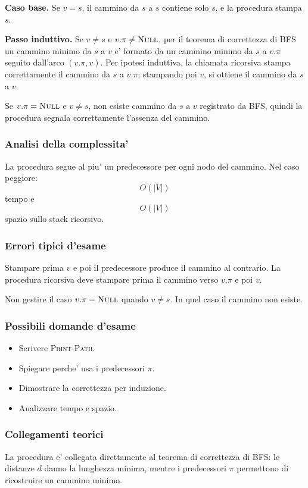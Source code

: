 \textbf{Caso base.}
Se $v=s$, il cammino da $s$ a $s$ contiene solo $s$, e la procedura stampa $s$.

\textbf{Passo induttivo.}
Se $v\neq s$ e $v.\pi\neq\textsc{Null}$, per il teorema di correttezza di BFS un cammino minimo da $s$ a $v$ e' formato da un cammino minimo da $s$ a $v.\pi$ seguito dall'arco $(v.\pi,v)$. Per ipotesi induttiva, la chiamata ricorsiva stampa correttamente il cammino da $s$ a $v.\pi$; stampando poi $v$, si ottiene il cammino da $s$ a $v$.

Se $v.\pi=\textsc{Null}$ e $v\neq s$, non esiste cammino da $s$ a $v$ registrato da BFS, quindi la procedura segnala correttamente l'assenza del cammino.

\subsubsection{Analisi della complessita'}
La procedura segue al piu' un predecessore per ogni nodo del cammino. Nel caso peggiore:
\[
O(|V|)
\]
tempo e
\[
O(|V|)
\]
spazio sullo stack ricorsivo.

\subsubsection{Errori tipici d'esame}
\begin{hardnote}
Stampare prima $v$ e poi il predecessore produce il cammino al contrario. La procedura ricorsiva deve stampare prima il cammino verso $v.\pi$ e poi $v$.
\end{hardnote}

\begin{hardnote}
Non gestire il caso $v.\pi=\textsc{Null}$ quando $v\neq s$. In quel caso il cammino non esiste.
\end{hardnote}

\subsubsection{Possibili domande d'esame}
\begin{itemize}
	\item Scrivere \textsc{Print-Path}.
	\item Spiegare perche' usa i predecessori $\pi$.
	\item Dimostrare la correttezza per induzione.
	\item Analizzare tempo e spazio.
\end{itemize}

\subsubsection{Collegamenti teorici}
La procedura e' collegata direttamente al teorema di correttezza di BFS: le distanze $d$ danno la lunghezza minima, mentre i predecessori $\pi$ permettono di ricostruire un cammino minimo.
